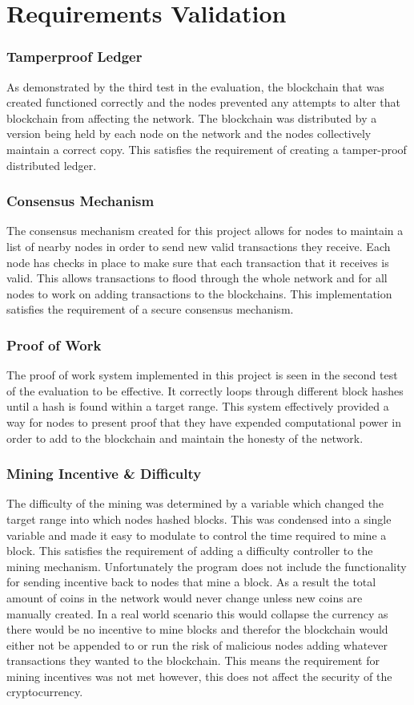 \documentclass{l4proj}
\begin{document}
\section{Requirements Validation}

\subsubsection{Tamperproof Ledger}
As demonstrated by the third test in the evaluation, the blockchain that was created functioned correctly and the nodes
prevented any attempts to alter that blockchain from affecting the network. The blockchain was distributed by a version
being held by each node on the network and the nodes collectively maintain a correct copy. This satisfies the requirement of creating a
tamper-proof distributed ledger.
\subsubsection{Consensus Mechanism}
The consensus mechanism created for this project allows for nodes to maintain a list of nearby nodes in order to send
new valid transactions they receive. Each node has checks in place to make sure that each transaction that it receives is valid.
This allows transactions to flood through the whole network and for all nodes to
work on adding transactions to the blockchains. This implementation satisfies the requirement of a secure consensus mechanism.
\subsubsection{Proof of Work}
The proof of work system implemented in this project is seen in the second test of the evaluation to be effective. It
correctly loops through different block hashes until a hash is found within a target range. This system effectively provided a way for nodes to present
proof that they have expended computational power in order to add to the blockchain and maintain the honesty of the 
network.
\subsubsection{Mining Incentive \& Difficulty}
The difficulty of the mining was determined by a variable which changed the target range into which nodes hashed
blocks. This was condensed into a single variable and made it easy to modulate to control the time required to 
mine a block. This satisfies the requirement of adding a difficulty controller to the mining mechanism. Unfortunately
the program does not include the functionality for sending incentive back to nodes that mine a block. As a result the
total amount of coins in the network would never change unless new coins are manually created. In a real world scenario
this would collapse the currency as there would be no incentive to mine blocks and therefor the blockchain would either
not be appended to or run the risk of malicious nodes adding whatever transactions they wanted to the blockchain. This
means the requirement for mining incentives was not met however, this does not affect the security of the cryptocurrency.
\end{document}
